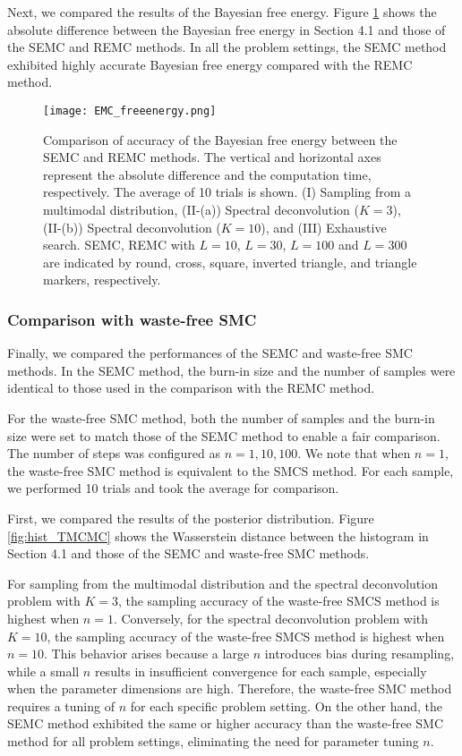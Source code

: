 \documentclass[12pt]{article}
\begin{document}
Next, we compared the results of the Bayesian free energy.
Figure \ref{fig:free_energy_EMC} shows the absolute difference between the Bayesian free energy in Section 4.1 and those of the SEMC and REMC methods.
In all the problem settings, the SEMC method exhibited highly accurate Bayesian free energy compared with the REMC method. \par
\begin{figure}[H]
  \centering
  \texttt{[image: EMC\_freeenergy.png]}
  \caption{Comparison of accuracy of the Bayesian free energy between the SEMC and REMC methods. 
  The vertical and horizontal axes represent the absolute difference and the computation time, respectively. 
  The average of 10 trials is shown. 
  (I) Sampling from a multimodal distribution, (II-(a)) Spectral deconvolution ($K=3$), (II-(b)) Spectral deconvolution ($K=10$), and (III) Exhaustive search. 
  SEMC, REMC with $L=10$, $L=30$, $L=100$ and $L=300$ are indicated by round, cross, square, inverted triangle, and triangle markers, respectively. }
  \label{fig:free_energy_EMC}
\end{figure}


\subsubsection{Comparison with waste-free SMC}

Finally, we compared the performances of the SEMC and waste-free SMC methods. 
In the SEMC method, the burn-in size and the number of samples were identical to those used in the comparison with the REMC method. \par

For the waste-free SMC method, both the number of samples and the burn-in size were set to match those of the SEMC method to enable a fair comparison.
The number of steps was configured as $n = 1,10,100$.
We note that when $n = 1$, the waste-free SMC method is equivalent to the SMCS method.
For each sample, we performed 10 trials and took the average for comparison. \par
First, we compared the results of the posterior distribution.
Figure \ref{fig:hist_TMCMC} shows the Wasserstein distance between the histogram in Section 4.1 and those of the SEMC and waste-free SMC methods. \par
For sampling from the multimodal distribution and the spectral deconvolution problem with $K = 3$, the sampling accuracy of the waste-free SMCS method is highest when $n = 1$.
Conversely, for the spectral deconvolution problem with $K = 10$, the sampling accuracy of the waste-free SMCS method is highest when $n = 10$.
This behavior arises because a large $n$ introduces bias during resampling, while a small $n$ results in insufficient convergence for each sample, especially when the parameter dimensions are high.
Therefore, the waste-free SMC method requires a tuning of $n$ for each specific problem setting. 
On the other hand, the SEMC method exhibited the same or higher accuracy than the waste-free SMC method for all problem settings, eliminating the need for parameter tuning $n$. \par
\end{document}

